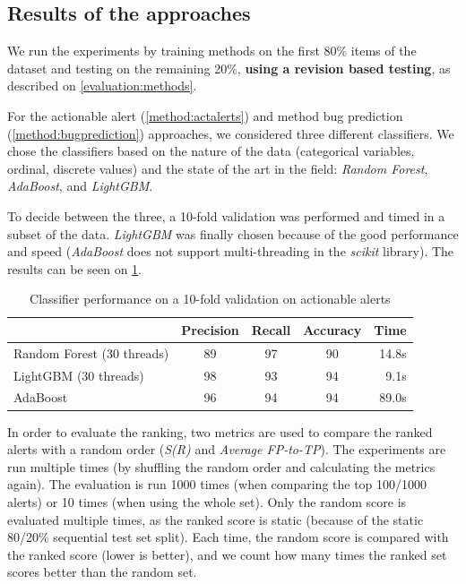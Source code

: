\subsection{Results of the approaches}
\label{evaluation:results}

We run the experiments by training methods on the first 80\% items of the dataset and testing on the remaining 20\%, \textbf{using a revision based testing}, as described on \cref{evaluation:methods}.

For the actionable alert (\cref{method:actalerts}) and method bug prediction (\cref{method:bugprediction}) approaches, we considered three different classifiers. We chose the classifiers based on the nature of the data (categorical variables, ordinal, discrete values) and the state of the art in the field: \textit{Random Forest}, \textit{AdaBoost}, and \textit{LightGBM}.

To decide between the three, a 10-fold validation was performed and timed in a subset of the data. \textit{LightGBM} was finally chosen because of the good performance and speed (\textit{AdaBoost} does not support multi-threading in the \textit{scikit} library).
The results can be seen on \cref{choosing_classifier}.

\begin{longtable}[c]{@{}lcccr@{}}
	\caption{Classifier performance on a 10-fold validation on actionable alerts}
	\label{choosing_classifier}\\
	\toprule
	& Precision & Recall & Accuracy & Time  \\* \midrule
	\endfirsthead
	\endhead
	\bottomrule
	\endfoot
	\endlastfoot
	Random Forest (30 threads) & 89        & 97     & 90       & 14.8s \\
	LightGBM (30 threads)      & 98        & 93     & 94       & 9.1s  \\
	AdaBoost      & 96        & 94     & 94       & 89.0s   \\* \bottomrule
\end{longtable}


In order to evaluate the ranking, two metrics are used to compare the ranked alerts with a random order (\textit{S(R)} and \textit{Average FP-to-TP}). The experiments are run multiple times (by shuffling the random order and calculating the metrics again).
The evaluation is run 1000 times (when comparing the top 100/1000 alerts) or 10 times (when using the whole set). Only the random score is evaluated multiple times, as the ranked score is static (because of the static 80/20\% sequential test set split). Each time, the random score is compared with the ranked score (lower is better), and we count how many times the ranked set scores better than the random set.

